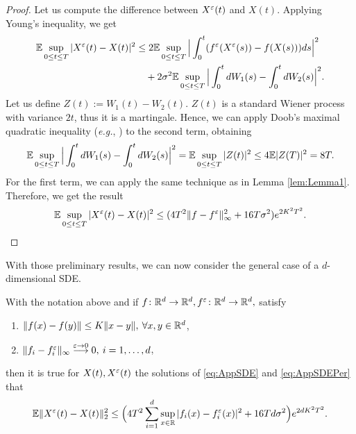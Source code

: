 \begin{proof} Let us compute the difference between $X^\varepsilon(t)$ and $X(t)$. Applying Young's inequality, we get
\begin{equation*}
\begin{aligned}
	\mathbb{E} \sup_{0 \leq t \leq T} |X^\varepsilon(t) - X(t)|^2 &\leq 2\mathbb{E} \sup_{0 \leq t \leq T}\Big|\int_0^t (f^\varepsilon (X^\varepsilon(s)) - f(X(s)))ds \Big|^2 \\
		&\quad + 2\sigma^2 \mathbb{E} \sup_{0 \leq t \leq T} \Big|\int_0^t dW_1(s) - \int_0^t dW_2(s)  \Big|^2.
\end{aligned}
\end{equation*}
Let us define $Z(t) := W_1(t) - W_2(t)$. $Z(t)$ is a standard Wiener process with variance $2t$, thus it is a martingale. Hence, we can apply Doob's maximal quadratic inequality (\textit{e.g.}, \cite[Page 11]{Protter2004}) to the second term, obtaining
\begin{equation*}
	\mathbb{E} \sup_{0 \leq t \leq T} \Big|\int_0^t dW_1(s) - \int_0^t dW_2(s)  \Big|^2 = \mathbb{E} \sup_{0 \leq t \leq T} | Z(t) |^2 \leq 4 \mathbb{E} |Z(T)|^2 = 8T.
\end{equation*}
For the first term, we can apply the same technique as in Lemma \ref{lem:Lemma1}. Therefore, we get the result
\begin{equation*}
	\mathbb{E} \sup_{0 \leq t \leq T} |X^\varepsilon(t) - X(t)|^2 \leq (4T^2 \|f - f^\varepsilon\|_{\infty}^2 + 16T\sigma^2) e^{2K^2T^2}.
\end{equation*}
\end{proof}
\noindent With those preliminary results, we can now consider the general case of a $d$-dimensional SDE.
\begin{theorem}\label{th:Prop} With the notation above and if $f\colon \mathbb{R}^d \rightarrow \mathbb{R}^d, f^\varepsilon\colon \mathbb{R}^d \rightarrow \mathbb{R}^d,$ satisfy
\begin{enumerate}
	\item $\|f(x) - f(y)\| \leq K\|x - y\|, \: \forall x,y \in \mathbb{R}^d$,
 	\item $\|f_i - f_i^\varepsilon\|_\infty \stackrel{\varepsilon \rightarrow 0}\longrightarrow 0, \: i = 1, \dots, d$,
\end{enumerate}
then it is true for $X(t), X^\varepsilon(t)$ the solutions of \eqref{eq:AppSDE} and \eqref{eq:AppSDEPer} that 
\begin{equation}\label{eq:Proposition}
	\mathbb{E} \| X^\varepsilon(t) - X(t) \|_2^2 \leq \Big(4T^2 \sum_{i=1}^d \sup_{x\in \mathbb{R}}|f_i(x) - f_i^\varepsilon(x)|^2 + 16Td\sigma^2\Big)e^{2dK^2T^2}.
\end{equation}
\end{theorem}
